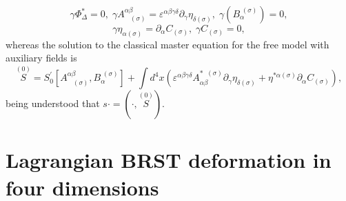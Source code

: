 \documentclass[a4paper,12pt]{article}
\begin{document}
\begin{equation}
\gamma \Phi _{\Delta }^{*}=0,\;\gamma A_{\;\;\;(\sigma )}^{\alpha \beta
}=\varepsilon ^{\alpha \beta \gamma \delta }\partial _{\gamma }\eta _{\delta
(\sigma )},\;\gamma \left( B_{\alpha }^{\;(\sigma )}\right) =0,
\label{fcola15}
\end{equation}
\begin{equation}
\gamma \eta _{\alpha (\sigma )}=\partial _{\alpha }C_{(\sigma )},\;\gamma
C_{(\sigma )}=0,  \label{fcola16}
\end{equation}
whereas the solution to the classical master equation for the free model
with auxiliary fields is 
\begin{equation}
\stackrel{(0)}{S}=S_{0}^{\prime }\left[ A_{\;\;\;(\sigma )}^{\alpha \beta
},B_{\alpha }^{\;(\sigma )}\right] +\int d^{4}x\left( \varepsilon ^{\alpha
\beta \gamma \delta }A_{\alpha \beta }^{*\;\;(\sigma )}\partial _{\gamma
}\eta _{\delta (\sigma )}+\eta ^{*\alpha (\sigma )}\partial _{\alpha
}C_{(\sigma )}\right) ,  \label{fcola17}
\end{equation}
being understood that $s\cdot =\left( \cdot ,\stackrel{(0)}{S}\right) $.

\section{Lagrangian BRST deformation in four dimensions}
\end{document}
